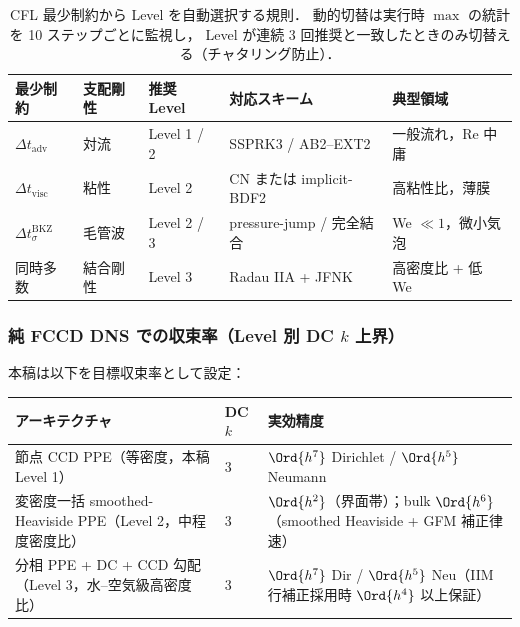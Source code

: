 \begin{table}[htbp]
\centering
\small
\begin{tabular}{@{}lllll@{}}
\hline
最少制約 & 支配剛性 & 推奨 Level & 対応スキーム & 典型領域 \\
\hline
$\Delta t_\text{adv}$ & 対流 &
  Level 1 / 2 & SSPRK3 / AB2--EXT2 &
  一般流れ，Re 中庸 \\
$\Delta t_\text{visc}$ & 粘性 &
  Level 2 & CN または implicit-BDF2 &
  高粘性比，薄膜 \\
$\Delta t_\sigma^\text{BKZ}$ & 毛管波 &
  Level 2 / 3 & pressure-jump / 完全結合 &
  We $\ll 1$，微小気泡 \\
同時多数 & 結合剛性 &
  Level 3 & Radau IIA + JFNK &
  高密度比 + 低 We \\
\hline
\end{tabular}
\caption{CFL 最少制約から Level を自動選択する規則．
動的切替は実行時 $\max$ の統計を 10 ステップごとに監視し，
Level が連続 3 回推奨と一致したときのみ切替える（チャタリング防止）．}
\label{tab:level_trigger}
\end{table}

\subsubsection{純 FCCD DNS での収束率（Level 別 DC $k$ 上界）}
\label{sec:dc_pure_fccd_convergence}

本稿は以下を目標収束率として設定：
\begin{center}
\begin{tabular}{@{}lll@{}}
\hline
アーキテクチャ & DC $k$ & 実効精度 \\
\hline
節点 CCD PPE（等密度，本稿 Level 1）& 3 & $\Ord{h^7}$ Dirichlet / $\Ord{h^5}$ Neumann \\
変密度一括 smoothed-Heaviside PPE（Level 2，中程度密度比）& 3 & $\Ord{h^2}$（界面帯）；bulk $\Ord{h^6}$（smoothed Heaviside + GFM 補正律速）\\
分相 PPE + DC + CCD 勾配（Level 3，水--空気級高密度比）& 3 & $\Ord{h^7}$ Dir / $\Ord{h^5}$ Neu（IIM 行補正採用時 $\Ord{h^4}$ 以上保証）\\
\hline
\end{tabular}
\end{center}

